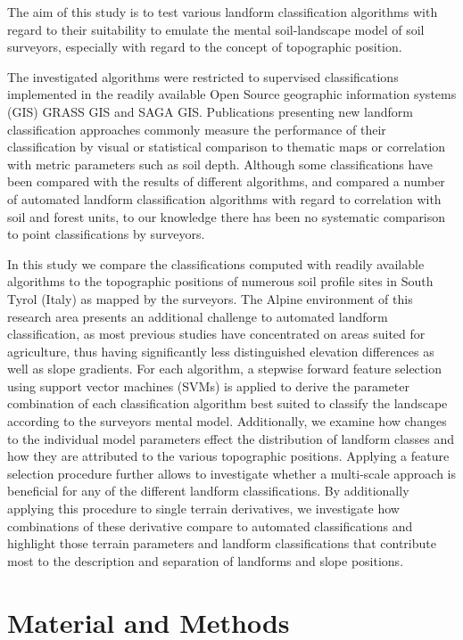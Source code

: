 \documentclass[final,1p,times,twocolumn,authoryear]{elsarticle}
\begin{document}
The aim of this study is to test various landform classification algorithms with regard to their suitability to emulate the mental soil-landscape model of soil surveyors, especially with regard to the concept of topographic position.

The investigated algorithms were restricted to supervised classifications implemented in the readily available Open Source geographic information systems (GIS) GRASS GIS and SAGA GIS. Publications presenting new landform classification approaches commonly measure the performance of their classification by visual or statistical comparison to thematic maps or correlation with metric parameters such as soil depth. Although some classifications have been compared with the results of different algorithms, and \cite{Barka2011} compared a number of automated landform classification algorithms with regard to correlation with soil and forest units, to our knowledge there has been no systematic comparison to point classifications by surveyors. 
 
In this study we compare the classifications computed with readily available algorithms to the topographic positions of numerous soil profile sites in South Tyrol (Italy) as mapped by the surveyors. The Alpine environment of this research area presents an additional challenge to automated landform classification, as most previous studies have concentrated on areas suited for agriculture, thus having significantly less distinguished elevation differences as well as slope gradients. For each algorithm, a stepwise forward feature selection using support vector machines (SVMs) is applied to derive the parameter combination of each classification algorithm best suited to classify the landscape according to the surveyors mental model. Additionally, we examine how changes to the individual model parameters effect the distribution of landform classes and how they are attributed to the various topographic positions. Applying a feature selection procedure further allows to investigate whether a multi-scale approach is beneficial for any of the different landform classifications. By additionally applying this procedure to single terrain derivatives, we investigate how combinations of these derivative compare to automated classifications and highlight those terrain parameters and landform classifications that contribute most to the description and separation of landforms and slope positions.
\section{Material and Methods}
\end{document}
